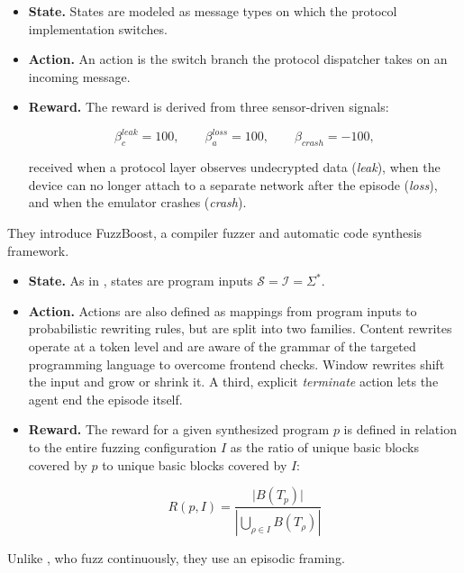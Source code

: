\begin{description}[style=nextline, leftmargin=0pt, labelindent=0pt, labelwidth=0pt]
    \begin{itemize}
      \item \textbf{State.}
        States are modeled as message types on which the protocol implementation switches.

      \item \textbf{Action.}
        An action is the switch branch the protocol dispatcher takes on an incoming message.

      \item \textbf{Reward.}
        The reward is derived from three sensor-driven signals:

        \[
          \beta^{\mathit{leak}}_c = 100, \qquad
          \beta^{\mathit{loss}}_a = 100, \qquad
          \beta_{\mathit{crash}} = -100,
        \]

        received when a protocol layer observes undecrypted data (\emph{leak}),
        when the device can no longer attach to a separate network after the episode (\emph{loss}),
        and when the emulator crashes (\emph{crash}).
    \end{itemize}

  \item[Liu et al.\ (2019)~\cite{liu_reinforcement_2019}]
    They introduce FuzzBoost, a compiler fuzzer and automatic code synthesis framework.

    \begin{itemize}
      \item \textbf{State.}
        As in \textcite{bottinger_deep_2018}, states are program inputs
        $\mathcal{S}=\mathcal{I}=\Sigma^{*}$.

      \item \textbf{Action.}
        Actions are also defined as mappings from program inputs to probabilistic rewriting rules,
        but are split into two families.
        Content rewrites operate at a token level and are aware of the grammar of the
        targeted programming language to overcome frontend checks.
        Window rewrites shift the input and grow or shrink it.
        A third, explicit \emph{terminate} action lets the agent end the episode itself.

      \item \textbf{Reward.}
        The reward for a given synthesized program $p$ is defined in relation to
        the entire fuzzing configuration $I$ as the ratio of unique basic blocks
        covered by $p$ to unique basic blocks covered by $I$:

        \[
          R(p,I)=\frac{\lvert B(T_p)\rvert}{\left\lvert\bigcup_{\rho\in I} B(T_\rho)\right\rvert}
        \]
    \end{itemize}
    Unlike \textcite{bottinger_deep_2018}, who fuzz continuously, they use an episodic framing.


\end{description}
